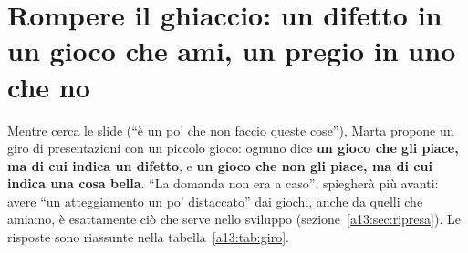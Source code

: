 \section[Rompere il ghiaccio]{Rompere il ghiaccio: un difetto in un gioco che ami, un pregio in uno che no}
\label{a13:sec:giro}

Mentre cerca le slide (``è un po' che non faccio queste cose''), Marta propone un giro
di presentazioni con un piccolo gioco: ognuno dice \textbf{un gioco che gli piace, ma di
cui indica un difetto}, e \textbf{un gioco che non gli piace, ma di cui indica una cosa
bella}. ``La domanda non era a caso'', spiegherà più avanti: avere ``un atteggiamento un
po' distaccato'' dai giochi, anche da quelli che amiamo, è esattamente ciò che serve
nello sviluppo (sezione~\ref{a13:sec:ripresa}). Le risposte sono riassunte nella
tabella~\ref{a13:tab:giro}.

